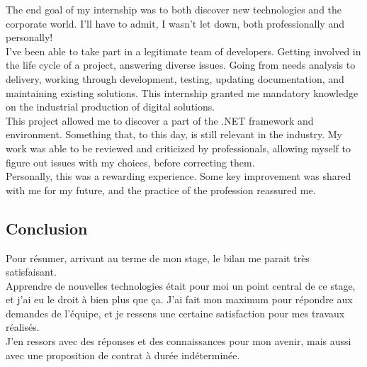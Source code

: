 \documentclass{rapport}
\begin{document}
The end goal of my internship was to both discover new technologies and the corporate world. I'll have to admit, I wasn't let down, both professionally and personally!\\

I've been able to take part in a legitimate team of developers. Getting involved in the life cycle of a project, answering diverse issues. Going from needs analysis to delivery, working through development, testing, updating documentation, and maintaining existing solutions. This internship granted me mandatory knowledge on the industrial production of digital solutions.\\

This project allowed me to discover a part of the .NET framework and environment. Something that, to this day, is still relevant in the industry.
My work was able to be reviewed and criticized by professionals, allowing myself to figure out issues with my choices, before correcting them.\\

Personally, this was a rewarding experience. Some key improvement was shared with me for my future, and the practice of the profession reassured me.

\subsection*{Conclusion}
Pour résumer, arrivant au terme de mon stage, le bilan me parait très satisfaisant. \\
Apprendre de nouvelles technologies était pour moi un point central de ce stage, et j'ai eu le droit à bien plus que ça. J'ai fait mon maximum pour répondre aux demandes de l'équipe, et je ressens une certaine satisfaction pour mes travaux réalisés. \\
J'en ressors avec des réponses et des connaissances pour mon avenir, mais aussi avec une proposition de contrat à durée indéterminée.
\end{document}
